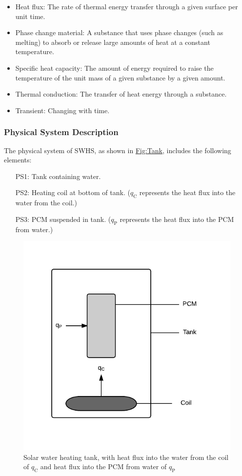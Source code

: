\documentclass[12pt]{article}
\begin{document}
\begin{itemize}
\item{Heat flux: The rate of thermal energy transfer through a given surface per unit time.}
\item{Phase change material: A substance that uses phase changes (such as melting) to absorb or release large amounts of heat at a constant temperature.}
\item{Specific heat capacity: The amount of energy required to raise the temperature of the unit mass of a given substance by a given amount.}
\item{Thermal conduction: The transfer of heat energy through a substance.}
\item{Transient: Changing with time.}
\end{itemize}
\subsubsection{Physical System Description}
\label{Sec:PhysSyst}
The physical system of SWHS, as shown in \hyperref[Figure:Tank]{Fig:Tank}, includes the following elements:

\begin{itemize}
\item[PS1:]{Tank containing water.}
\item[PS2:]{Heating coil at bottom of tank. (${q_{\text{C}}}$ represents the heat flux into the water from the coil.)}
\item[PS3:]{PCM suspended in tank. (${q_{\text{P}}}$ represents the heat flux into the PCM from water.)}
\end{itemize}
\begin{figure}
\begin{center}
\includegraphics[width=\textwidth]{../../../../datafiles/swhs/Tank.png}
\caption{Solar water heating tank, with heat flux into the water from the coil of ${q_{\text{C}}}$ and heat flux into the PCM from water of ${q_{\text{P}}}$}
\label{Figure:Tank}
\end{center}
\end{figure}
\end{document}
